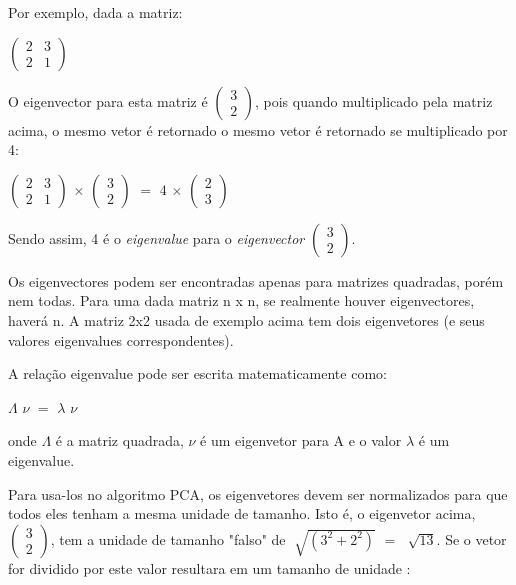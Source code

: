 Por exemplo, dada a matriz:

\begin{center}
	$\begin{pmatrix} 2 & 3 \\ 2 & 1 \end{pmatrix}$
\end{center}

O eigenvector para esta matriz é $\begin{pmatrix} 3 \\ 2\end{pmatrix}$, pois quando multiplicado pela matriz acima, o mesmo vetor é retornado o mesmo vetor é retornado se multiplicado por 4:

\begin{center}
	$\begin{pmatrix} 2 & 3 \\ 2 & 1 \end{pmatrix}$ $\times$ $\begin{pmatrix} 3 \\ 2 \end{pmatrix}$ $=$ $4$ $\times$ $\begin{pmatrix} 2 \\ 3\end{pmatrix}$
\end{center}

Sendo assim, 4 é o \textit{eigenvalue} para o \textit{eigenvector}  $\begin{pmatrix} 3 \\ 2\end{pmatrix}$.

Os eigenvectores podem ser encontradas apenas para matrizes quadradas, porém nem todas. Para uma dada matriz n x n, se realmente houver eigenvectores, haverá n. A matriz 2x2 usada de exemplo acima tem dois eigenvetores (e seus valores eigenvalues correspondentes).

A relação eigenvalue pode ser escrita matematicamente como: 

 $\Lambda$ $\nu$  $=$  $\lambda$ $\nu$  

onde $\Lambda$ é a matriz quadrada, $\nu$ é um eigenvetor para A e o valor $\lambda$ é um eigenvalue.

Para usa-los no algoritmo PCA, os eigenvetores devem ser normalizados para que todos eles tenham a mesma unidade de tamanho. Isto é, o eigenvetor acima, $\begin{pmatrix} 3 \\ 2\end{pmatrix}$, tem a unidade de tamanho "falso" de  $\sqrt[]{(3^2 + 2^2)}$ $=$ $\sqrt[]{13}$. Se o vetor for dividido por este valor resultara em um tamanho de unidade \cite{drmathew_java_programming}:

